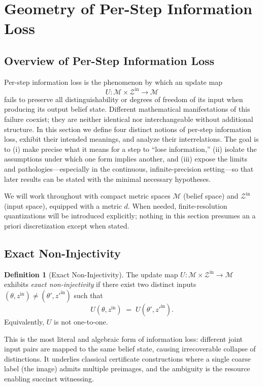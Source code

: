 \documentclass[12pt]{article}
\theoremstyle{definition}
\newtheorem{definition}{Definition}[section]
\theoremstyle{plain}
\begin{document}
\section{Geometry of Per-Step Information Loss}
\subsection{Overview of Per-Step Information Loss}

Per-step information loss is the phenomenon by which an update map
\[
U: \mathcal{M} \times \mathcal{Z}^{\mathrm{in}} \to \mathcal{M}
\]
fails to preserve all distinguishability or degrees of freedom of its input when producing its output belief state.  Different mathematical manifestations of this failure coexist; they are neither identical nor interchangeable without additional structure.  In this section we define four distinct notions of per-step information loss, exhibit their intended meanings, and analyze their interrelations.  The goal is to (i) make precise what it means for a step to ``lose information,'' (ii) isolate the assumptions under which one form implies another, and (iii) expose the limits and pathologies—especially in the continuous, infinite-precision setting—so that later results can be stated with the minimal necessary hypotheses.

We will work throughout with compact metric spaces \(\mathcal{M}\) (belief space) and \(\mathcal{Z}^{\mathrm{in}}\) (input space), equipped with a metric \(d\).  When needed, finite-resolution quantizations will be introduced explicitly; nothing in this section presumes an a priori discretization except when stated.  

\subsection{Exact Non-Injectivity}

\begin{definition}[Exact Non-Injectivity]
The update map \(U: \mathcal{M} \times \mathcal{Z}^{\mathrm{in}} \to \mathcal{M}\) exhibits \emph{exact non-injectivity} if there exist two distinct inputs \((\theta,z^{\mathrm{in}}) \neq (\theta',z'^{\mathrm{in}})\) such that
\[
U(\theta,z^{\mathrm{in}})\;=\;U(\theta',z'^{\mathrm{in}}).
\]
Equivalently, \(U\) is not one-to-one.
\end{definition}

This is the most literal and algebraic form of information loss: different joint input pairs are mapped to the same belief state, causing irrecoverable collapse of distinctions.  It underlies classical certificate constructions where a single coarse label (the image) admits multiple preimages, and the ambiguity is the resource enabling succinct witnessing.
\end{document}
